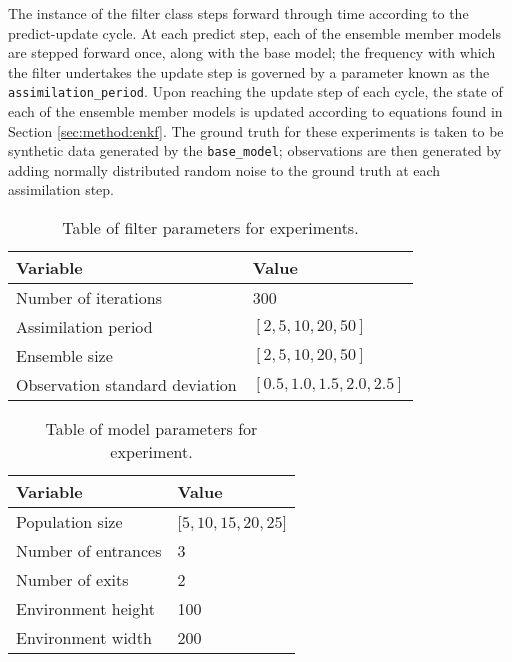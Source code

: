 The instance of the filter class steps forward through time according to the
predict-update cycle.
At each predict step, each of the ensemble member models are stepped forward
once, along with the base model; the frequency with which the filter undertakes
the update step is governed by a parameter known as the
\texttt{assimilation\_period}.
Upon reaching the update step of each cycle, the state of each of the ensemble
member models is updated according to equations found in Section
\ref{sec:method:enkf}.
The ground truth for these experiments is taken to be synthetic data generated
by the \texttt{base\_model}; observations are then generated by adding normally
distributed random noise to the ground truth at each assimilation step.

\begin{table}[h]
    \centering
    \begin{tabular}{@{}ll@{}}
        \toprule
        Variable                       & Value                         \\ \midrule
        Number of iterations           & 300                           \\
        Assimilation period            & $[2, 5, 10, 20, 50]$          \\
        Ensemble size                  & $[2, 5, 10, 20, 50]$          \\
        Observation standard deviation & $[0.5, 1.0, 1.5, 2.0, 2.5]$   \\ \bottomrule
    \end{tabular}
    \caption{Table of filter parameters for experiments.}\label{tab:filter_params}
    \label{tab:filter_params}
\end{table}

\begin{table}[h]
    \centering
    \begin{tabular}{@{}ll@{}}
    \toprule
        Variable            & Value                 \\ \midrule
        Population size     & $[5, 10, 15, 20, 25$] \\
        Number of entrances & 3                     \\
        Number of exits     & 2                     \\
        Environment height  & 100                   \\
        Environment width   & 200                   \\ \bottomrule
    \end{tabular}
    \caption{Table of model parameters for experiment.}\label{tab:model_params}
    \label{tab:model_params}
\end{table}

